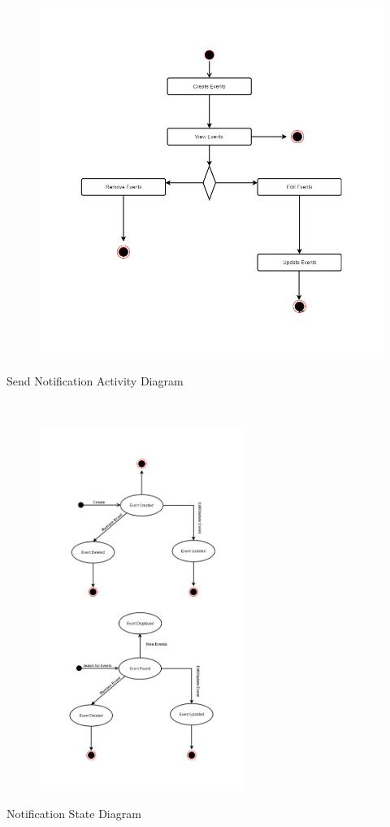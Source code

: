 \documentclass{article}
\begin{document}
    \mbox{}\\
    \bigskip
    \clearpage
    
    \begin{figure}[h!]
        \includegraphics[width=\textwidth]{Images/ActivityDiagramAdmin.jpg}
    \end{figure}
    Send Notification Activity Diagram
    
    \mbox{}\\
    \bigskip
    \clearpage
    
    \begin{figure}[h!]
        \begin{center}
            \includegraphics[width=0.6\textwidth]{Images/StateDiagramEvent.jpg}
        \end{center}
    \end{figure}
    Notification State Diagram
    
    \mbox{}\\
\end{document}
